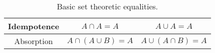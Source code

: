 \begin{table}[hbt]
\begin{center}
\begin{tabular}{c|c|c}
\begin{minipage}{.25\textwidth} \rule{0pt}{22pt}Idempotence\rule[-10pt]{0pt}{10pt} \end{minipage} & 
\begin{minipage}{.35\textwidth} \centerline{$A \cap A = A$} \end{minipage} & 
\begin{minipage}{.35\textwidth} \centerline{$A \cup A = A$} \end{minipage} \\ \hline
\begin{minipage}{.25\textwidth} \rule{0pt}{22pt}Absorption\rule[-10pt]{0pt}{10pt} \end{minipage} & 
\begin{minipage}{.35\textwidth} \centerline{$A \cap (A \cup B) = A$} \end{minipage} & 
\begin{minipage}{.35\textwidth} \centerline{$A \cup (A \cap B) = A$} \end{minipage} \\
\end{tabular} 
\end{center} 
\caption{Basic set theoretic equalities.}
\label{tab:set_equiv}
\end{table}

\clearpage



